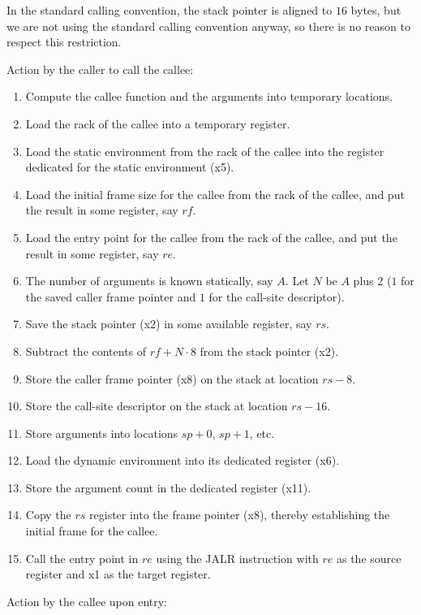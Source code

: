 In the standard \riscv{} calling convention, the stack pointer is
aligned to $16$ bytes, but we are not using the standard \riscv{}
calling convention anyway, so there is no reason to respect this
restriction.

Action by the caller to call the callee:

\begin{enumerate}
\item Compute the callee function and the arguments into temporary
  locations.
\item Load the rack of the callee into a temporary register.
\item Load the static environment from the rack of the callee into the
  register dedicated for the static environment (x5).
\item Load the initial frame size for the callee from the rack of the
  callee, and put the result in some register, say $rf$.
\item Load the entry point for the callee from the rack of the callee,
  and put the result in some register, say $re$.
\item The number of arguments is known statically, say $A$.  Let $N$
  be $A$ plus $2$ ($1$ for the saved caller frame pointer and $1$ for
  the call-site descriptor).
\item Save the stack pointer (x2) in some available register, say $rs$.
\item Subtract the contents of $rf + N \cdot 8$ from the stack
  pointer (x2).
\item Store the caller frame pointer (x8) on the stack at location $rs
  - 8$.
\item Store the call-site descriptor on the stack at location $rs -
  16$.
\item Store arguments into locations $sp +  0$, $sp +  1$, etc.
\item Load the dynamic environment into its dedicated register (x6).
\item Store the argument count in the dedicated register (x11).
\item Copy the $rs$ register into the frame pointer (x8), thereby
  establishing the initial frame for the callee.
\item Call the entry point in $re$ using the JALR instruction with
  $re$ as the source register and x1 as the target register.
\end{enumerate}


Action by the callee upon entry:

